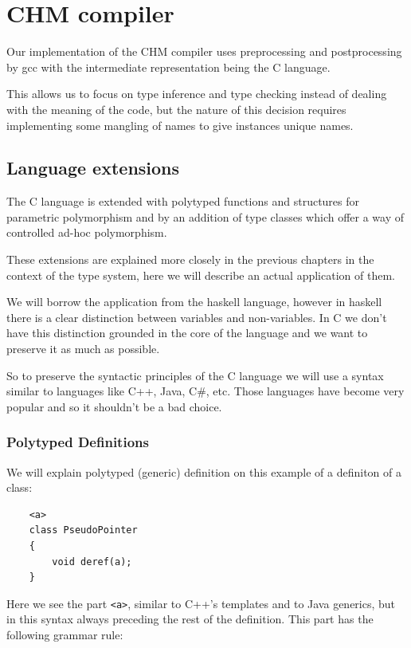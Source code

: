 \chapter{CHM compiler}

Our implementation of the CHM compiler uses preprocessing and postprocessing by gcc with the intermediate representation being the C language.

This allows us to focus on type inference and type checking instead of dealing with the meaning of the code, but the nature of this decision requires implementing some mangling of names to give instances unique names.

\section{Language extensions}

The C language is extended with polytyped functions and structures for parametric polymorphism and by an addition of type classes which offer a way of controlled ad-hoc polymorphism.

These extensions are explained more closely in the previous chapters in the context of the type system, here we will describe an actual application of them.

We will borrow the application from the haskell language, however in haskell there is a clear distinction between variables and non-variables. In C we don't have this distinction grounded in the core of the language and we want to preserve it as much as possible.

So to preserve the syntactic principles of the C language we will use a syntax similar to languages like C++, Java, C\#, etc. Those languages have become very popular and so it shouldn't be a bad choice. %

\subsection{Polytyped Definitions}

We will explain polytyped (generic) definition on this example of a definiton of a class:

\begin{lstlisting}
    <a>
    class PseudoPointer
    {
        void deref(a);
    }
\end{lstlisting}

Here we see the part \lstinline{<a>}, similar to C++'s templates and to Java generics, but in this syntax always preceding the rest of the definition. This part has the following grammar rule: %

